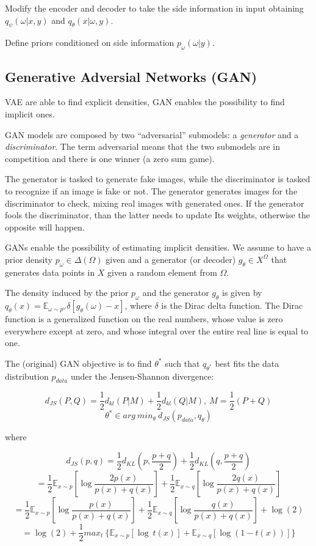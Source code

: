 \documentclass{article}
\begin{document}
Modify the encoder and decoder to take the side information in input
obtaining \(q_{\psi}(\omega | x, y)\) and \(q_{\theta}(x|\omega, y)\).

Define priors conditioned on side information \(p_{\omega}(\omega |y)\).

\subsection{Generative Adversial Networks
(GAN)}\label{generative-adversial-networks-gan}

VAE are able to find explicit densities, GAN enables the possibility to
find implicit ones.

GAN models are composed by two ``adversarial'' submodels: a
\emph{generator} and a \emph{discriminator}. The term adversarial means
that the two submodels are in competition and there is one winner (a
zero sum game).

The generator is tasked to generate fake images, while the discriminator
is tasked to recognize if an image is fake or not. The generator
generates images for the discriminator to check, mixing real images with
generated ones. If the generator fools the discriminator, than the
latter needs to update Its weights, otherwise the opposite will happen.

GANs enable the possibility of estimating implicit densities. We assume
to have a prior density \(p_\omega \in \Delta (\Omega)\) given and a
generator (or decoder) \(g_\theta \in X^{\Omega}\) that generates data
points in \(X\) given a random element from \(\Omega\).

The density induced by the prior \(p_{\omega}\) and the generator
\(g_{\theta}\) is given by
\(q_{\theta}(x)=\mathbb{E}_{\omega \sim p^{\omega}}\delta [g_\theta (\omega)-x]\),
where \(\delta\) is the Dirac delta function. The Dirac function is a
generalized function on the real numbers, whose value is zero everywhere
except at zero, and whose integral over the entire real line is equal to
one.

The (original) GAN objective is to find \(\theta^*\) such that
\(q_{\theta^*}\) best fits the data distribution \(p_{data}\) under the
Jensen-Shannon divergence:

\[d_{JS}(P, Q)=\frac{1}{2}d_{kl}(P|M)+\frac{1}{2}d_{kl}(Q|M),\ M=\frac{1}{2}(P+Q)\]
\[\theta^* \in arg\ min_{\theta}\ d_{JS}(p_{data}, q_{\theta})\]

where

\[d_{JS}(p, q)=\frac{1}{2}d_{KL}(p, \frac{p+q}{2})+\frac{1}{2}d_{KL}(q, \frac{p+q}{2})\]
\[=\frac{1}{2}\mathbb{E}_{x\sim p}[\log\frac{2p(x)}{p(x)+q(x)}]+\frac{1}{2}\mathbb{E}_{x\sim q}[\log\frac{2q(x)}{p(x)+q(x)}]\]
\[=\frac{1}{2}\mathbb{E}_{x\sim p}[\log\frac{p(x)}{p(x)+q(x)}]+\frac{1}{2}\mathbb{E}_{x\sim q}[\log\frac{q(x)}{p(x)+q(x)}] + \log(2)\]
\[=\log(2)+\frac{1}{2}max_t\ \{ \mathbb{E}_{x\sim p}[\log\ t(x)] + \mathbb{E}_{x\sim q}[\log(1-t(x))] \}\]
\end{document}
